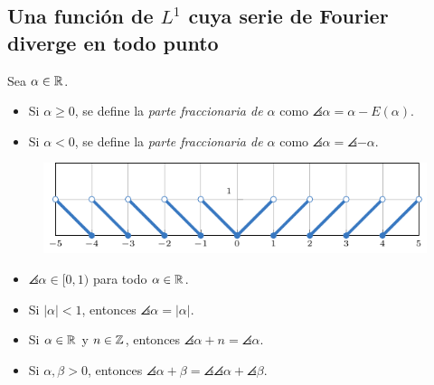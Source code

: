 \documentclass{beamer}
\begin{document}
\subsection{Una función de \texorpdfstring{$L^1$}{L1} cuya serie de Fourier diverge en todo punto}

\begin{frame}
    \begin{block}{}
        Sea $\alpha \in \mathbb R$.
        \begin{itemize}
            \item Si $\alpha \geq 0$, se define la \emph{parte fraccionaria de $\alpha$} como $\angles{\alpha} = \alpha - E(\alpha)$.
            \item Si $\alpha < 0$, se define la \emph{parte fraccionaria de $\alpha$} como $\angles{\alpha} = \angles{-\alpha}$.
        \end{itemize} 
        \begin{figure}
        \centering
        \includegraphics[scale = 0.9]{images/1.pdf}
        \end{figure}
    \end{block}
    \pause
    \begin{block}{}
        \begin{itemize}
            \item $\angles{\alpha} \in [0,1)$ para todo $\alpha\in\mathbb R$.
            \item Si $|\alpha| < 1$, entonces $\angles{\alpha}=|\alpha| $.
            \item Si $\alpha\in\mathbb R$ y $n \in \mathbb Z$, entonces $\angles{\alpha+n} = \angles{\alpha}$. 
            \item Si $\alpha,\beta > 0$, entonces $\angles{\alpha+\beta} = \angles{\angles{\alpha}+\angles{\beta}}$.
        \end{itemize}
    \end{block}
\end{frame}
\end{document}

